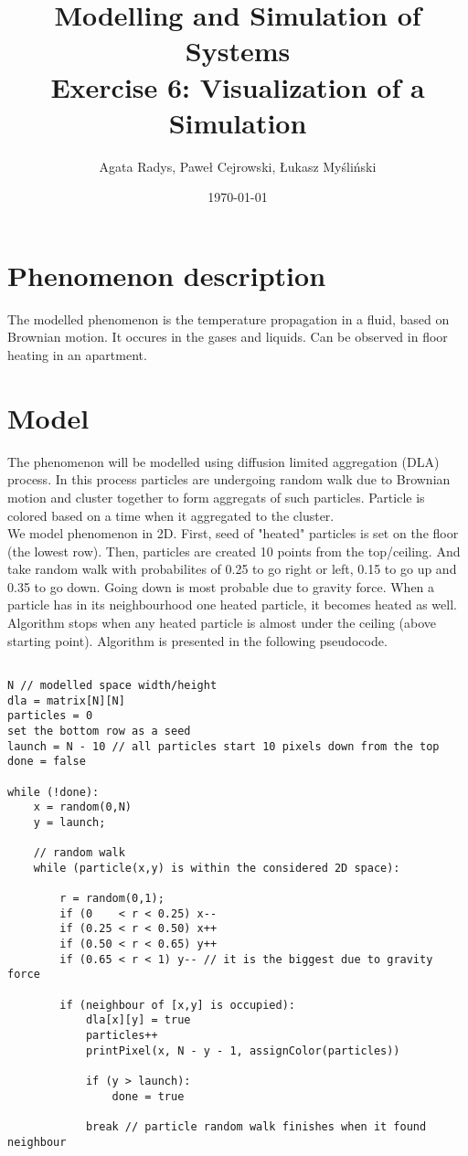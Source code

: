 \documentclass[a4paper,10pt]{article}
\title{Modelling and Simulation of Systems\\ \Large
Exercise 6: Visualization of a Simulation}
\author{Agata Radys, Paweł Cejrowski, Łukasz Myśliński}
\date{\today}
\begin{document}
\maketitle

\section*{Phenomenon description}
The modelled phenomenon is the temperature propagation in a fluid, based on Brownian motion. It occures in the gases and
liquids. Can be observed in floor heating in an apartment.
\section*{Model}
The phenomenon will be modelled using diffusion limited aggregation (DLA) process. In this process particles are undergoing
random walk due to Brownian motion and cluster together to form aggregats of such particles. Particle is colored based on a time
when it aggregated to the cluster.
\\
We model phenomenon in 2D. First, seed of "heated" particles is set on the floor (the lowest row). Then, particles are created
10 points from the top/ceiling. And take random walk with probabilites of 0.25 to go right or left, 0.15 to go up and 0.35 to go down.
Going down is most probable due to gravity force. When a particle has in its neighbourhood one heated particle, it becomes heated as well.
Algorithm stops when any heated particle is almost under the ceiling (above starting point). Algorithm is presented in the following pseudocode.

\begin{lstlisting}[]

N // modelled space width/height
dla = matrix[N][N]
particles = 0
set the bottom row as a seed
launch = N - 10 // all particles start 10 pixels down from the top
done = false

while (!done):
    x = random(0,N)
    y = launch;

    // random walk
    while (particle(x,y) is within the considered 2D space):

        r = random(0,1);
        if (0    < r < 0.25) x--
        if (0.25 < r < 0.50) x++
        if (0.50 < r < 0.65) y++
        if (0.65 < r < 1) y-- // it is the biggest due to gravity force

        if (neighbour of [x,y] is occupied):
            dla[x][y] = true
            particles++
            printPixel(x, N - y - 1, assignColor(particles))

            if (y > launch):
                done = true

            break // particle random walk finishes when it found neighbour
\end{lstlisting}
\end{document}

